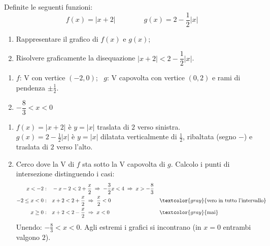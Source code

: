 
\begin{question}[ID=5.3, subtitle={Grafico e disequazione con $f(x)=|x+2|$ e $g(x)=2-\frac12|x|$}, tags={trasformazioni geometriche, valore assoluto}, difficulty=media]
Definite le seguenti funzioni:
\[ f(x) = |x+2| \qquad\qquad g(x) = 2 - \dfrac{1}{2}|x| \]
\begin{enumerate}
\item Rappresentare il grafico di $f(x)$ e $g(x)$;
\item Risolvere graficamente la disequazione $|x+2| < 2 - \dfrac{1}{2}|x|$.
\end{enumerate}
\begin{solution}
\begin{enumerate}
    \item $f$: V con vertice $(-2,0)$; \ $g$: V capovolta con vertice $(0,2)$ e rami di pendenza $\pm\tfrac12$.
    \item $-\dfrac83<x<0$
\end{enumerate}
\begin{center}
\end{center}
\end{solution}
\begin{explanation}
\begin{enumerate}
    \item $f(x)=|x+2|$ è $y=|x|$ traslata di $2$ verso sinistra. \\
    $g(x)=2-\tfrac12|x|$ è $y=|x|$ dilatata verticalmente di $\tfrac12$, ribaltata (segno $-$) e traslata di $2$ verso l'alto.
    \item Cerco dove la V di $f$ sta sotto la V capovolta di $g$. Calcolo i punti di intersezione distinguendo i casi:
    \[\begin{aligned}
    x<-2: &\quad -x-2<2+\dfrac x2 \;\Rightarrow\; -\dfrac32x<4 \;\Rightarrow\; x>-\dfrac83\\
    -2\leq x<0: &\quad x+2<2+\dfrac x2 \;\Rightarrow\; \dfrac x2<0 && \textcolor{gray}{\text{vero in tutto l'intervallo}}\\
    x\geq0: &\quad x+2<2-\dfrac x2 \;\Rightarrow\; x<0 && \textcolor{gray}{\text{mai}}
    \end{aligned}\]
    Unendo: $-\tfrac83<x<0$. Agli estremi i grafici si incontrano (in $x=0$ entrambi valgono $2$).
\end{enumerate}
\end{explanation}
\end{question}

